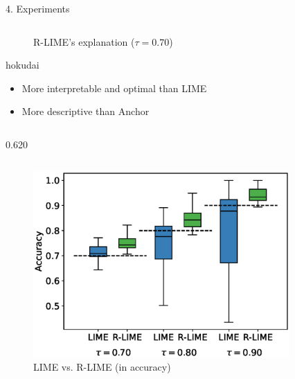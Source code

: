 \documentclass[unicode]{beamer}
\begin{document}
\begin{frame}
\begin{columns}[t]
\begin{column}{\lcol\textwidth}
\begin{block}{4. Experiments}
\begin{columns}[t]
\begin{column}{.295\textwidth}
\begin{figure}
							\vspace{-0.1em}
							\caption{R-LIME's explanation ($\tau=0.70$)}
						\end{figure}
						\vspace{0.8em}
						\begin{beamercolorbox}[colsep=0.1cm,rounded=true,shadow=true]{hokudai}
							\begin{itemize}
								\setlength{\itemsep}{0.3em}
								\item More interpretable and optimal than LIME
								\item More descriptive than Anchor
							\end{itemize}
							\vspace{0.5em}
						\end{beamercolorbox}
					\end{column}
				\end{columns}
				\begin{columns}
					\def\lcol{0.620}
					\def\rcol{0.295}
					\begin{column}{\lcol\textwidth}
						\vspace{-2.5em}
						\begin{columns}[t]
							\begin{column}{.509\textwidth}
								\begin{figure}
									\includegraphics[width=.88\textwidth]{src/experiments/exp2/box_plot}
									\vspace{-0.4em}
									\caption{LIME vs. R-LIME (in accuracy)}
								\end{figure}
							\end{column}
							\begin{column}{.491\textwidth}
								\begin{figure}

\end{figure}
\end{column}
\end{columns}
\end{column}
\end{columns}
\end{block}
\end{column}
\end{columns}
\end{frame}
\end{document}
